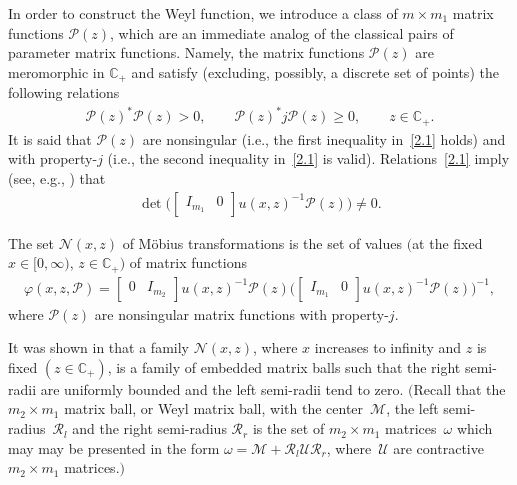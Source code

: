 \documentclass[pdftex]{sigma}
\def\om{\omega}
\def\vp{\varphi}
\def\BC{{\mathbb C}}
\def\clp{{\mathcal P}}
\def\clr{{\mathcal R}}
\def\clm{{\mathcal M}}
\def\cln{{\mathcal N}}
\def\clu{{\mathcal U}}
\numberwithin{equation}{section}
\begin{document}
In order to construct the Weyl function, we introduce a class of $m \times m_1$ matrix functions
$\clp(z)$, which are an immediate analog of the classical pairs
of parameter matrix functions. Namely, the matrix functions
$\clp(z)$ are meromorphic in $\BC_+$ and satisfy
(excluding, possibly, a discrete set of points)
the following relations
\begin{gather}\label{2.1}
\clp(z)^*\clp(z) >0, \qquad \clp(z)^* j \clp(z) \geq 0, \qquad z\in \BC_+.
\end{gather}
It is said that $\clp(z)$ are nonsingular (i.e., the f\/irst inequality in~\eqref{2.1} holds)
and with property-$j$ (i.e., the second inequality in~\eqref{2.1} is valid).
Relations~\eqref{2.1} imply (see, e.g., \cite{FKRSp1}) that
\begin{gather*}  %
\det \big(\begin{bmatrix}
I_{m_1} & 0
\end{bmatrix}u(x,z)^{-1}\clp(z)\big)\not= 0.
\end{gather*}
\begin{Definition} \label{set}
The set $\cln(x,z)$ of M\"obius transformations is the set of values $($at the f\/ixed $x \in [0, \infty)$, $z\in \BC_+)$
of matrix functions
\begin{gather*}%
\vp(x,z,\clp)=\begin{bmatrix}
0 &I_{m_2}
\end{bmatrix}u(x,z)^{-1}\clp(z)\big(\begin{bmatrix}
I_{m_1} & 0
\end{bmatrix}u(x,z)^{-1}\clp(z)\big)^{-1},
\end{gather*}
where $\clp(z)$ are nonsingular matrix functions
 with property-$j$.
 \end{Definition}

 \begin{Remark}\label{MB}
 It was shown in \cite{FKRSp1} that a family $\cln(x,z)$, where $x$ increases to inf\/inity and $z$ is f\/ixed
 $(z \in \BC_+)$,
is a family of embedded matrix balls such that the right semi-radii
 are uniformly bounded and the left semi-radii tend to zero. $($Recall that the $m_2\times m_1$ matrix ball, or Weyl matrix ball, with the center~$\clm$, the left semi-radius~$\clr_l$
 and the right semi-radius $\clr_r$ is the set of
 $m_2\times m_1$ matrices~$\om$
 which may may be presented
 in the form $\om = \clm + \clr_l \clu \clr_r$, where~$\clu$ are contractive $m_2\times m_1$ matrices.$)$
 \end{Remark}
\end{document}
